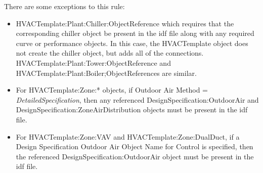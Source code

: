There are some exceptions to this rule:

\begin{itemize}
\item
  HVACTemplate:Plant:Chiller:ObjectReference which requires that the corresponding chiller object be present in the idf file along with any required curve or performance objects. In this case, the HVACTemplate object does not create the chiller object, but adds all of the connections. HVACTemplate:Plant:Tower:ObjectReference and HVACTemplate:Plant:Boiler;ObjectReferences are similar.
\item
  For HVACTemplate:Zone:* objects, if Outdoor Air Method = \emph{DetailedSpecification}, then any referenced DesignSpecification:OutdoorAir and DesignSpecification:ZoneAirDistribution objects must be present in the idf file.
\item
  For HVACTemplate:Zone:VAV and HVACTemplate:Zone:DualDuct, if a Design Specification Outdoor Air Object Name for Control is specified, then the referenced DesignSpecification:OutdoorAir object must be present in the idf file.
\end{itemize}